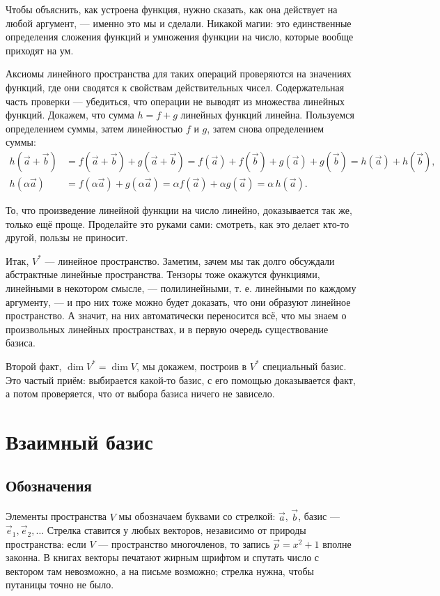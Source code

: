 \documentclass[11pt,a4paper]{article}
\begin{document}
Чтобы объяснить, как устроена функция, нужно сказать, как она действует на любой аргумент, — именно это мы и сделали. Никакой магии: это единственные определения сложения функций и умножения функции на число, которые вообще приходят на ум.

Аксиомы линейного пространства для таких операций проверяются на значениях функций, где они сводятся к свойствам действительных чисел. Содержательная часть проверки — убедиться, что операции не выводят из множества линейных функций. Докажем, что сумма $h = f + g$ линейных функций линейна. Пользуемся определением суммы, затем линейностью $f$ и $g$, затем снова определением суммы:
\[
\begin{aligned}
h(\vec a + \vec b) &= f(\vec a + \vec b) + g(\vec a + \vec b) = f(\vec a) + f(\vec b) + g(\vec a) + g(\vec b) = h(\vec a) + h(\vec b), \\
h(\alpha \vec a) &= f(\alpha \vec a) + g(\alpha \vec a) = \alpha f(\vec a) + \alpha g(\vec a) = \alpha\, h(\vec a).
\end{aligned}
\]

То, что произведение линейной функции на число линейно, доказывается так же, только ещё проще. Проделайте это руками сами: смотреть, как это делает кто-то другой, пользы не приносит.

Итак, $V^*$ — линейное пространство. Заметим, зачем мы так долго обсуждали абстрактные линейные пространства. Тензоры тоже окажутся функциями, линейными в некотором смысле, — полилинейными, т. е. линейными по каждому аргументу, — и про них тоже можно будет доказать, что они образуют линейное пространство. А значит, на них автоматически переносится всё, что мы знаем о произвольных линейных пространствах, и в первую очередь существование базиса.

Второй факт, $\dim V^* = \dim V$, мы докажем, построив в $V^*$ специальный базис. Это частый приём: выбирается какой-то базис, с его помощью доказывается факт, а потом проверяется, что от выбора базиса ничего не зависело.

\section{Взаимный базис}

\subsection{Обозначения}

Элементы пространства $V$ мы обозначаем буквами со стрелкой: $\vec a$, $\vec b$, базис — $\vec e_1, \vec e_2, \dots$ Стрелка ставится у любых векторов, независимо от природы пространства: если $V$ — пространство многочленов, то запись $\vec p = x^2 + 1$ вполне законна. В книгах векторы печатают жирным шрифтом и спутать число с вектором там невозможно, а на письме возможно; стрелка нужна, чтобы путаницы точно не было.
\end{document}

